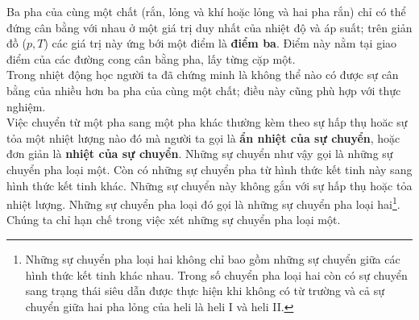 Ba pha của cùng một chất (rắn, lỏng và khí hoặc lỏng và hai pha rắn) chỉ có thể đứng cân bằng với nhau ở một giá trị duy nhất của nhiệt độ và áp suất; trên giản đồ ($p,T$) các giá trị này ứng bới một điểm là \textbf{điểm ba}. Điểm này nằm tại giao điểm của các đường cong cân bằng pha, lấy từng cặp một.\\

Trong nhiệt động học người ta đã chứng minh là không thể nào có được sự cân bằng của nhiều hơn ba pha của cùng một chất; điều này cũng phù hợp với thực nghiệm.\\

Việc chuyển từ một pha sang một pha khác thường kèm theo sự hấp thụ hoăc sự tỏa một nhiệt lượng nào đó mà người ta gọi là \textbf{ẩn nhiệt của sự chuyển}, hoặc đơn giản là \textbf{nhiệt của sự chuyển}. Những sự chuyển như vậy gọi là những sự chuyển pha loại một. Còn có những sự chuyển pha từ hình thức kết tinh này sang hình thức kết tinh khác. Những sự chuyển này không gắn với sự hấp thụ hoặc tỏa nhiệt lượng. Những sự chuyển pha loại đó gọi là những sự chuyển pha loại hai\footnote{Những sự chuyển pha loại hai không chỉ bao gồm những sự chuyển giữa các hình thức kết tinh khác nhau. Trong số chuyển pha loại hai còn có sự chuyển sang trạng thái siêu dẫn được thực hiện khi không có từ trường và cả sự chuyển giữa hai pha lỏng của heli là heli I và heli II.}. Chúng ta chỉ hạn chế trong việc xét những sự chuyển pha loại một.\\

